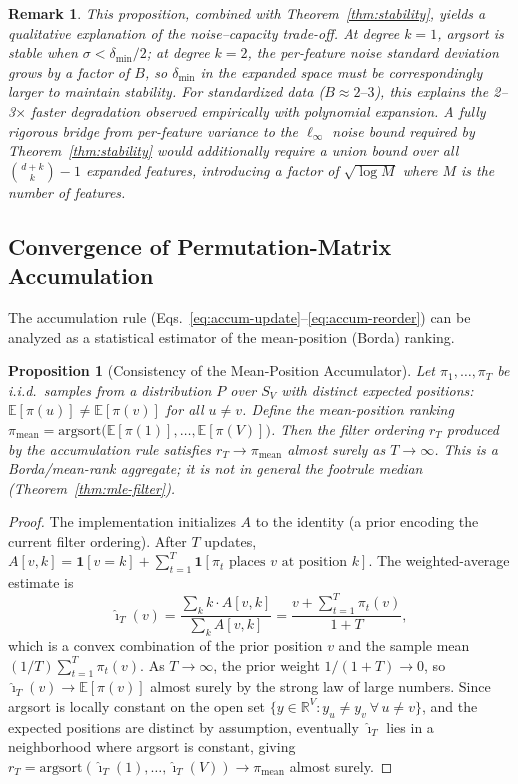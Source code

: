 \documentclass[12pt]{article}
\newcommand{\R}{\mathbb{R}}
\newcommand{\E}{\mathbb{E}}
\newcommand{\argsort}{\mathrm{argsort}}
\newtheorem{proposition}[theorem]{Proposition}
\newtheorem{remark}{Remark}
\begin{document}
\begin{remark}
This proposition, combined with Theorem~\ref{thm:stability}, yields a qualitative explanation of the noise--capacity trade-off. At degree $k=1$, argsort is stable when $\sigma < \delta_{\min}/2$; at degree $k=2$, the per-feature noise standard deviation grows by a factor of $B$, so $\delta_{\min}$ in the expanded space must be correspondingly larger to maintain stability. For standardized data ($B \approx 2\text{--}3$), this explains the 2--3$\times$ faster degradation observed empirically with polynomial expansion. A fully rigorous bridge from per-feature variance to the $\ell_\infty$ noise bound required by Theorem~\ref{thm:stability} would additionally require a union bound over all $\binom{d+k}{k}-1$ expanded features, introducing a factor of $\sqrt{\log M}$ where $M$ is the number of features.
\end{remark}

\subsection{Convergence of Permutation-Matrix Accumulation}

The accumulation rule (Eqs.~\ref{eq:accum-update}--\ref{eq:accum-reorder}) can be analyzed as a statistical estimator of the mean-position (Borda) ranking.

\begin{proposition}[Consistency of the Mean-Position Accumulator]
\label{prop:convergence}
Let $\pi_1, \ldots, \pi_T$ be i.i.d.\ samples from a distribution $P$ over $S_V$ with distinct expected positions: $\E[\pi(u)] \neq \E[\pi(v)]$ for all $u \neq v$. Define the \emph{mean-position ranking} $\pi_{\mathrm{mean}} = \argsort\big(\E[\pi(1)], \ldots, \E[\pi(V)]\big)$. Then the filter ordering $r_T$ produced by the accumulation rule satisfies $r_T \to \pi_{\mathrm{mean}}$ almost surely as $T \to \infty$. This is a Borda/mean-rank aggregate; it is \emph{not} in general the footrule median (Theorem~\ref{thm:mle-filter}).
\end{proposition}

\begin{proof}
The implementation initializes $A$ to the identity (a prior encoding the current filter ordering). After $T$ updates, $A[v, k] = \mathbf{1}[v{=}k] + \sum_{t=1}^T \mathbf{1}[\pi_t \text{ places } v \text{ at position } k]$. The weighted-average estimate is
\[
\hat{\imath}_T(v) = \frac{\sum_k k \cdot A[v,k]}{\sum_k A[v,k]} = \frac{v + \sum_{t=1}^T \pi_t(v)}{1 + T},
\]
which is a convex combination of the prior position $v$ and the sample mean $(1/T)\sum_{t=1}^T \pi_t(v)$. As $T \to \infty$, the prior weight $1/(1+T) \to 0$, so $\hat{\imath}_T(v) \to \E[\pi(v)]$ almost surely by the strong law of large numbers. Since argsort is locally constant on the open set $\{y \in \R^V : y_u \neq y_v\ \forall\, u \neq v\}$, and the expected positions are distinct by assumption, eventually $\hat{\imath}_T$ lies in a neighborhood where argsort is constant, giving $r_T = \argsort(\hat{\imath}_T(1), \ldots, \hat{\imath}_T(V)) \to \pi_{\mathrm{mean}}$ almost surely.
\end{proof}
\end{document}
